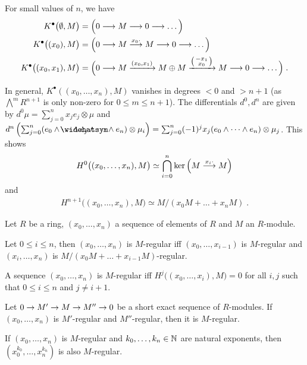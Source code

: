 \documentclass[a4paper,parskip=half,numbers=enddot, DIV=12]{scrreprt}
\begin{document}
\begin{example}
	\begin{alphanumerate}
		\item {}For small values of $n$, we have
		\begin{align*}
			K^\bullet\big(\emptyset,M\big)&=\Big(0\morphism M\morphism 0\morphism\ldots\Big)\\
			K^\bullet\big((x_0),M\big)&=\Big(0\morphism M\morphism[x_0\cdot] M\morphism 0\morphism\ldots\Big)\\
			K^\bullet\big((x_0,x_1),M\big)&=\Big(0\morphism M\xrightarrow{(x_0,x_1)} M\oplus M\xrightarrow{\left(\begin{smallmatrix}
			-x_1\\
			x_0
			\end{smallmatrix}\right)} M\morphism 0\morphism\ldots\Big)\;.
		\end{align*}
		\item In general, $K^\bullet((x_0,\ldots,x_n),M)$ vanishes in degrees $<0$ and $>n+1$ (as $\bigwedge^mR^{n+1}$ is only non-zero for $0\leq m\leq n+1$). The differentials  $d^0,d^n$ are given by $d^0\mu=\sum_{j=0}^nx_je_j\otimes \mu$ and $d^n\left(\sum_{j=0}^n(e_0\wedge\cdots\wedge\roof{e}_j\wedge\cdots\wedge e_n)\otimes \mu_i\right)=\sum_{j=0}^n(-1)^jx_j (e_0\wedge\cdots\wedge e_n)\otimes\mu_j$. This shows
		\begin{align*}
			H^0\big((x_0,\ldots,x_n),M\big)\simeq\bigcap_{i=0}^n\ker\left(M\morphism[x_i\cdot ]M\right)
		\end{align*}
		and
		\begin{align*}
			H^{n+1}\big((x_0,\ldots,x_n),M\big)\simeq M/(x_0M+\ldots+x_nM)\;.
		\end{align*}
	\end{alphanumerate}
\end{example}
\begin{fact}
	Let $R$ be a ring, $(x_0,\ldots,x_n)$ a sequence of elements of $R$ and $M$ an $R$-module.
	\begin{alphanumerate}
		\item Let $0\leq i\leq n$, then $(x_0,\ldots,x_n)$ is $M$-regular iff $(x_0,\ldots,x_{i-1})$ is $M$-regular and $(x_i,\ldots,x_n)$ is $M/(x_0M+\ldots+x_{i-1}M)$-regular.
		\item A sequence $(x_0,\ldots,x_n)$ is $M$-regular iff $H^j\big((x_0,\ldots,x_i),M\big)=0$ for all $i,j$ such that $0\leq i\leq n$ and $j\neq i+1$.
		\item Let $0\morphism M'\morphism M\morphism M''\morphism 0$ be a short exact sequence of $R$-modules. If $(x_0,\ldots,x_n)$ is $M'$-regular and $M''$-regular, then it is $M$-regular.
		\item If $(x_0,\ldots,x_n)$ is $M$-regular and $k_0,\ldots,k_n\in \mathbb{N}$ are natural exponents, then $(x_0^{k_0},\ldots,x_n^{k_n})$ is also $M$-regular.
	\end{alphanumerate}
\end{fact}
\end{document}
